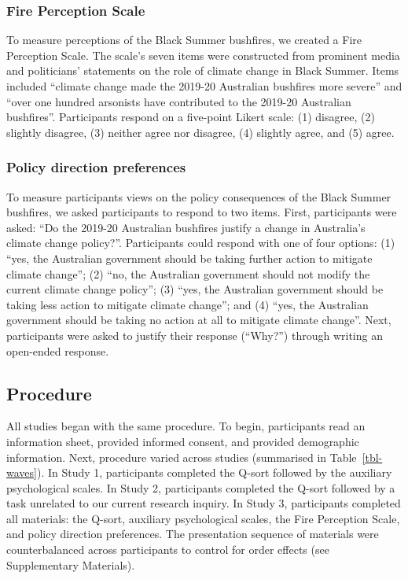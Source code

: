 \documentclass[
  letterpaper,
  DIV=11,
  numbers=noendperiod]{scrartcl}
\begin{document}
\subsubsection{Fire Perception Scale}\label{fire-perception-scale}

To measure perceptions of the Black Summer bushfires, we created a Fire
Perception Scale. The scale's seven items were constructed from
prominent media and politicians' statements on the role of climate
change in Black Summer. Items included ``climate change made the 2019-20
Australian bushfires more severe'' and ``over one hundred arsonists have
contributed to the 2019-20 Australian bushfires''. Participants respond
on a five-point Likert scale: (1) disagree, (2) slightly disagree, (3)
neither agree nor disagree, (4) slightly agree, and (5) agree.

\subsubsection{Policy direction
preferences}\label{policy-direction-preferences}

To measure participants views on the policy consequences of the Black
Summer bushfires, we asked participants to respond to two items. First,
participants were asked: ``Do the 2019-20 Australian bushfires justify a
change in Australia's climate change policy?''. Participants could
respond with one of four options: (1) ``yes, the Australian government
should be taking further action to mitigate climate change''; (2) ``no,
the Australian government should not modify the current climate change
policy''; (3) ``yes, the Australian government should be taking less
action to mitigate climate change''; and (4) ``yes, the Australian
government should be taking no action at all to mitigate climate
change''. Next, participants were asked to justify their response
(``Why?'') through writing an open-ended response.

\subsection{Procedure}\label{procedure}

All studies began with the same procedure. To begin, participants read
an information sheet, provided informed consent, and provided
demographic information. Next, procedure varied across studies
(summarised in Table~\ref{tbl-waves}). In Study 1, participants
completed the Q-sort followed by the auxiliary psychological scales. In
Study 2, participants completed the Q-sort followed by a task unrelated
to our current research inquiry. In Study 3, participants completed all
materials: the Q-sort, auxiliary psychological scales, the Fire
Perception Scale, and policy direction preferences. The presentation
sequence of materials were counterbalanced across participants to
control for order effects (see Supplementary Materials).
\end{document}
